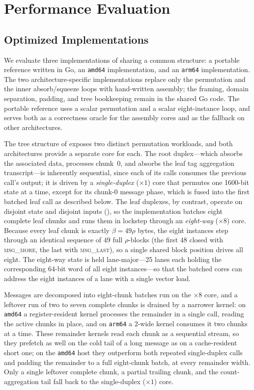 \section{Performance Evaluation}
\label{sec:performance}

\subsection{Optimized Implementations}
\label{sec:impl}

We evaluate three implementations of \TW{} sharing a common structure: a
portable reference written in Go, an \texttt{amd64} implementation, and an
\texttt{arm64} implementation. The two architecture-specific implementations
replace only the \Keccakp{} permutation and the inner absorb/squeeze
loops with hand-written assembly; the framing, domain separation, padding, and
tree bookkeeping remain in the shared Go code. The portable reference uses a
scalar permutation and a scalar eight-instance loop, and serves both as a
correctness oracle for the assembly cores and as the fallback on other
architectures.

The tree structure of \TW{} exposes two distinct permutation workloads, and
both architectures provide a separate core for each. The root duplex---which
absorbs the associated data, processes chunk~$0$, and absorbs the leaf tag
aggregation transcript---is inherently sequential, since each of its calls
consumes the previous call's output; it is driven by a \emph{single-duplex}
($\times 1$) core that permutes one 1600-bit state at a time, except for its
chunk-$0$ message phase, which is fused into the first batched leaf call as
described below. The leaf duplexes,
by contrast, operate on disjoint state and disjoint inputs (),
so the implementation batches eight complete leaf chunks and runs them in
lockstep through an \emph{eight-way} ($\times 8$) core. Because every leaf chunk
is exactly $\beta = 49\rho$ bytes, the eight instances step through an identical
sequence of $49$ full $\rho$-blocks (the first $48$ closed with
\textsc{msg\_more}, the last with \textsc{msg\_last}), so a single shared block
position drives all eight. The eight-way state is held lane-major---25 lanes
each holding the corresponding 64-bit word of all eight instances---so that the
batched cores can address the eight instances of a lane with a single
vector load.

Messages are decomposed into eight-chunk batches run on the $\times 8$ core,
and a leftover run of two to seven complete chunks is drained by a
narrower kernel: on \texttt{amd64} a register-resident kernel processes the
remainder in a single call, reading the active chunks in place, and on
\texttt{arm64} a $2$-wide kernel consumes it two chunks at a time. These
remainder kernels read each chunk as a sequential stream, so they prefetch as
well on the cold tail of a long message as on a cache-resident short one; on
the \texttt{amd64} host they outperform both repeated single-duplex calls and
padding the remainder to a full eight-chunk batch, at every remainder width.
Only a single leftover complete chunk, a partial trailing chunk, and the
count-aggregation tail fall back to the single-duplex ($\times 1$) core.


